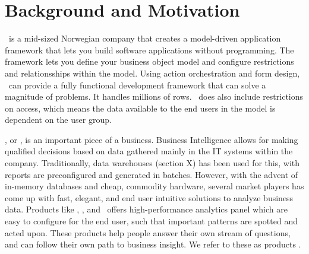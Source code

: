 \section{Background and Motivation}
\label{sec:background-and-motivation}

\genus~is a mid-sized Norwegian company that creates a model-driven application framework that lets you build software applications without programming. The framework lets you define your business object model and configure restrictions and relationsships within the model. Using action orchestration and form design, \genusSoftware~can provide a fully functional development framework that can solve a magnitude of problems. It handles millions of rows. \genusSoftware~does also include restrictions on access, which means the data available to the end users in the model is dependent on the user group. 

\bi, or \ba, is an important piece of a business. Business Intelligence allows for making qualified decisions based on data gathered mainly in the IT systems within the company. Traditionally, data warehouses (section X) has been used for this, with reports are preconfigured and generated in batches. However, with the advent of in-memory databases and cheap, commodity hardware, several market players has come up with fast, elegant, and end user intuitive solutions to analyze business data. Products like \qlikview, \tableau, and \powerpivot~offers high-performance analytics panel which are easy to configure for the end user, such that important patterns are spotted and acted upon. These products help people answer their own stream of questions, and can follow their own path to business insight. We refer to these as  products \cite{Qlik2014-vd}.

